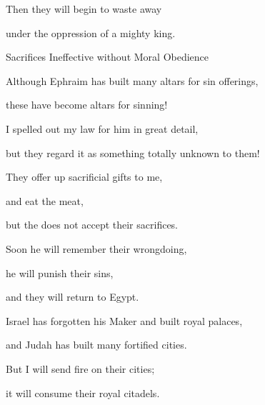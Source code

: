{\par }{\Q Then they will begin
to waste away
\par }{\Q under the oppression
of a mighty king.
\par }{\SH Sacrifices Ineffective without Moral Obedience
\par }{\Q {}Although
Ephraim
has built many
altars
for sin
offerings,
\par }{\Q these have become
altars
for sinning!
\par }{\Q {}I spelled out
my law
for him in great detail,
\par }{\Q but they regard
it as something
totally unknown to them!
\par }{\Q {}They offer up sacrificial
gifts
to me,
\par }{\Q and eat
the meat,
\par }{\Q but the
{}
does not
accept
their sacrifices.

\par }{\Q Soon
he will remember
their wrongdoing,
\par }{\Q he will punish
their sins,
\par }{\Q and they
will return
to Egypt.
\par }{\Q {}Israel
has forgotten
his Maker
and built
royal palaces,
\par }{\Q and Judah
has built many
fortified
cities.
\par }{\Q But I will send
fire
on their cities;
\par }{\Q it will consume
their royal citadels.

\par }
